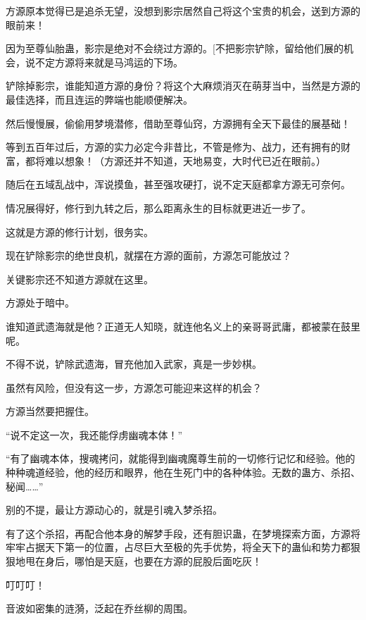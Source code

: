 
\begin{this_body}



方源原本觉得已是追杀无望，没想到影宗居然自己将这个宝贵的机会，送到方源的眼前来！

因为至尊仙胎蛊，影宗是绝对不会绕过方源的。[不把影宗铲除，留给他们展的机会，说不定方源将来就是马鸿运的下场。

铲除掉影宗，谁能知道方源的身份？将这个大麻烦消灭在萌芽当中，当然是方源的最佳选择，而且连运的弊端也能顺便解决。

然后慢慢展，偷偷用梦境潜修，借助至尊仙窍，方源拥有全天下最佳的展基础！

等到五百年过后，方源的实力必定今非昔比，不管是修为、战力，还有拥有的财富，都将难以想象！（方源还并不知道，天地易变，大时代已近在眼前。）

随后在五域乱战中，浑说摸鱼，甚至强攻硬打，说不定天庭都拿方源无可奈何。

情况展得好，修行到九转之后，那么距离永生的目标就更进近一步了。

这就是方源的修行计划，很务实。

现在铲除影宗的绝世良机，就摆在方源的面前，方源怎可能放过？

关键影宗还不知道方源就在这里。

方源处于暗中。

谁知道武遗海就是他？正道无人知晓，就连他名义上的亲哥哥武庸，都被蒙在鼓里呢。

不得不说，铲除武遗海，冒充他加入武家，真是一步妙棋。

虽然有风险，但没有这一步，方源怎可能迎来这样的机会？

方源当然要把握住。

“说不定这一次，我还能俘虏幽魂本体！”

“有了幽魂本体，搜魂拷问，就能得到幽魂魔尊生前的一切修行记忆和经验。他的种种魂道经验，他的经历和眼界，他在生死门中的各种体验。无数的蛊方、杀招、秘闻……”

别的不提，最让方源动心的，就是引魂入梦杀招。

有了这个杀招，再配合他本身的解梦手段，还有胆识蛊，在梦境探索方面，方源将牢牢占据天下第一的位置，占尽巨大至极的先手优势，将全天下的蛊仙和势力都狠狠地甩在身后，哪怕是天庭，也要在方源的屁股后面吃灰！

叮叮叮！

音波如密集的涟漪，泛起在乔丝柳的周围。


\end{this_body}
